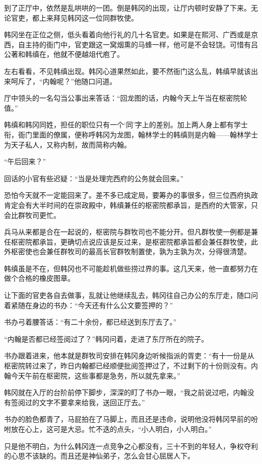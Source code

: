 到了正厅中，依然是乱哄哄的一团。倒是韩冈的出现，让厅内顿时安静了下来。无论官吏，都上来拜见韩冈这一位同群牧使。

韩冈坐在正位之侧，低头看着向他行礼的几十名官吏。如果是在熙河、广西或是京西，自主持的衙门中，官吏跟这一窝烟熏的马蜂一样，他可是不会轻饶。可惜有吕公著和韩缜在，他就不便越俎代庖了。

左右看看，不见韩缜出现。韩冈心道果然如此，要不然衙门这么乱，韩缜早就该出来呵斥了，“内翰呢？”他随口问道。

厅中领头的一名勾当公事出来答话：“回龙图的话，内翰今天上午当在枢密院轮值。”

韩缜和韩冈同姓，担任的职位只有一个‘同’字上的差别。加上两人身上都有学士衔，衙门里面的僚属，便称呼韩冈为龙图，翰林学士的韩缜则是内翰——翰林学士为天子私人，又称内制，故而简称内翰。

“午后回来？”

回话的小官有些迟疑：“当是处理完西府的公务就会回来。”

恐怕今天就不一定能回来了。差不多已成定局，要筹办的事很多，但三位西府执政肯定会有大半时间的在崇政殿中，韩缜兼任的枢密院都承旨，是西府的大管家，只会比群牧司更忙。

兵马从来都是合在一起说的，枢密院与群牧司也不能分开。但凡群牧使一例都是兼任枢密院都承旨，更确切点说应该是反过来，是枢密院都承旨都会兼任群牧使，此外枢密使也会兼任群牧司的最高长官群牧制置使，孰为主孰为次，分得很清楚。

韩缜虽是不在，但韩冈也不可能趁机做些捞过界的事。这几天来，他一直都努力在做个合格的橡皮图章。

让下面的官吏各自去做事，乱就让他继续乱去，韩冈往自己办公的东厅走，随口问着紧随在身边的书办：“今天还有什么公文要签押的？”

书办弓着腰答话：“有二十余份，都已经送到东厅去了。”

“内翰是否都已经签阅过了？”韩冈问着，走进了东厅所在的院子。

书办跟着进来，他本就是群牧司安排在韩冈身边听候指派的胥吏：“有十一份是从枢密院转过来了，昨日内翰都已经顺便批阅签押过了，不过剩下的十份则没有。内翰今天午前在枢密院，这些事都是急务，所以就先拿来。”

韩冈就在入厅的台阶前停下脚步，深深的盯了书办一眼，“我之前说过吧，内翰没有签阅过的文字不要拿来给我，送回正厅去。”

书办的脸色都青了，马屁拍在了马脚上，而且还是违命，说明他没将韩冈早前的吩咐放在心上，这可是大忌。忙不迭的点头，“小人明白，小人明白。”

只是他不明白，为什么韩冈连一点竞争之心都没有，三十不到的年轻人，争权夺利的心思不该缺的。而且还是神仙弟子，怎么会甘心屈居人下。

